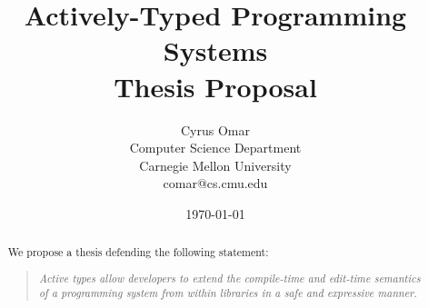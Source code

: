 \documentclass[10pt]{article}
\title{Actively-Typed Programming Systems\\\vspace{5px}\large{{Thesis Proposal}}}
\author{Cyrus Omar\\
Computer Science Department\\
Carnegie Mellon University\\
comar@cs.cmu.edu}
\date{\today}                                           %
\begin{document}
\maketitle

\begin{abstract}
We propose a thesis defending the following statement:
\begin{quote}
\emph{Active types allow developers to extend the compile-time and edit-time semantics of a programming system  from within libraries in a safe and expressive manner.
}
\end{quote}
\end{abstract}


\sloppy

\begin{center}



\normalsize
\end{center}







%




\newpage

%
%

\setcounter{page}{1}
\renewcommand{\thepage}{References - \arabic{page}}



%
%
\end{document}
